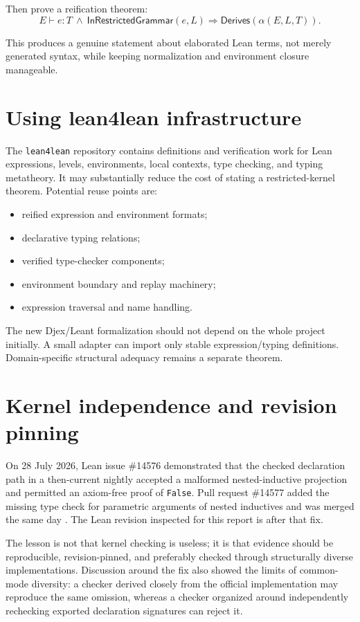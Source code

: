\documentclass[11pt,letterpaper,openany]{report}
\theoremstyle{definition}
\theoremstyle{remark}
\newcommand{\code}[1]{\texttt{#1}}
\begin{document}
Then prove a reification theorem:
\[
  E\vdash e:T \ \wedge\ \mathsf{InRestrictedGrammar}(e,L)
  \Longrightarrow
  \mathsf{Derives}(\alpha(E,L,T)).
\]

This produces a genuine statement about elaborated Lean terms, not merely generated syntax, while keeping normalization and environment closure manageable.

\section{Using lean4lean infrastructure}

The \code{lean4lean} repository contains definitions and verification work for Lean expressions, levels, environments, local contexts, type checking, and typing metatheory. It may substantially reduce the cost of stating a restricted-kernel theorem. Potential reuse points are:

\begin{itemize}
\item reified expression and environment formats;
\item declarative typing relations;
\item verified type-checker components;
\item environment boundary and replay machinery;
\item expression traversal and name handling.
\end{itemize}

The new Djex/Leant formalization should not depend on the whole project initially. A small adapter can import only stable expression/typing definitions. Domain-specific structural adequacy remains a separate theorem.

\section{Kernel independence and revision pinning}
\label{sec:kernel-independence}

On 28 July 2026, Lean issue \#14576 demonstrated that the checked declaration path in a then-current nightly accepted a malformed nested-inductive projection and permitted an axiom-free proof of \code{False}. Pull request \#14577 added the missing type check for parametric arguments of nested inductives and was merged the same day \cite{leanbug14576,leanfix14577}. The Lean revision inspected for this report is after that fix.

The lesson is not that kernel checking is useless; it is that evidence should be reproducible, revision-pinned, and preferably checked through structurally diverse implementations. Discussion around the fix also showed the limits of common-mode diversity: a checker derived closely from the official implementation may reproduce the same omission, whereas a checker organized around independently rechecking exported declaration signatures can reject it.
\end{document}
